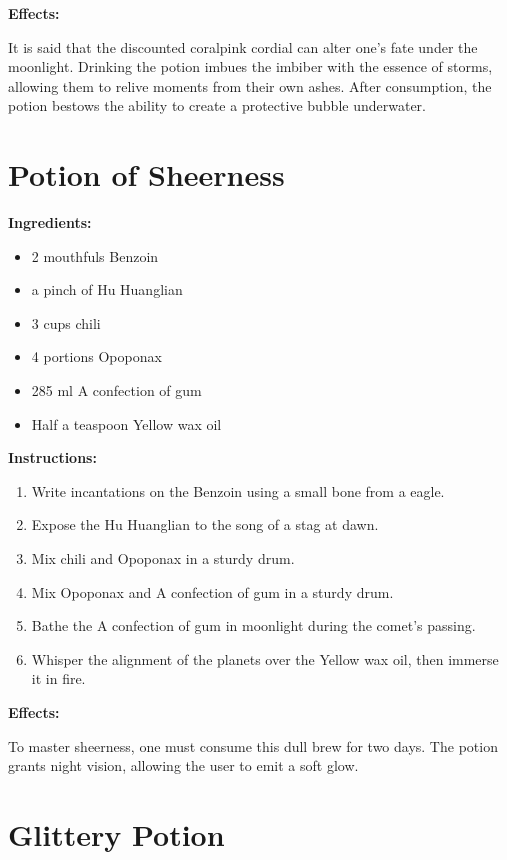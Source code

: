 \documentclass{article}
\begin{document}
\textbf{Effects:}

It is said that the discounted coralpink cordial can alter one's fate under the moonlight. Drinking the potion imbues the imbiber with the essence of storms, allowing them to relive moments from their own ashes. After consumption, the potion bestows the ability to create a protective bubble underwater.

\newpage
\section*{Potion of Sheerness}

\textbf{Ingredients:}

\begin{itemize}
  \item 2 mouthfuls Benzoin
  \item a pinch of Hu Huanglian
  \item 3 cups chili
  \item 4 portions Opoponax
  \item 285 ml A confection of gum
  \item Half a teaspoon Yellow wax oil
\end{itemize}

\textbf{Instructions:}

\begin{enumerate}
  \item Write incantations on the Benzoin using a small bone from a eagle.
  \item Expose the Hu Huanglian to the song of a stag at dawn.
  \item Mix chili and Opoponax in a sturdy drum.
  \item Mix Opoponax and A confection of gum in a sturdy drum.
  \item Bathe the A confection of gum in moonlight during the comet’s passing.
  \item Whisper the alignment of the planets over the Yellow wax oil, then immerse it in fire.
\end{enumerate}

\textbf{Effects:}

To master sheerness, one must consume this dull brew for two days. The potion grants night vision, allowing the user to emit a soft glow.

\newpage
\section*{Glittery Potion}
\end{document}
